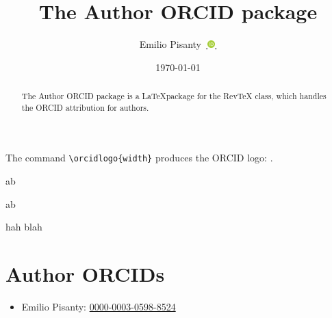 \documentclass[%
  twoside,
  reprint,
  amsmath,amssymb,
  aps,
  pra,
  nofootinbib,
  showpacs,
  superscriptaddress,
  a4paper,
]{revtex4-1}
\newcommand{\orcid}[1]{%
  \href{%
    https://orcid.org/#1%
  }{%
   \,\protect\includegraphics[width=8pt]{ORCID-icon.png}\,%
  }%
}
\begin{document}
\title{The Author ORCID package}


\author{Emilio Pisanty\,\orcid{0000-0003-0598-8524}}


\date{\today}



\begin{abstract}
The Author ORCID package is a \LaTeX package for the RevTeX class, which handles the ORCID attribution for authors.
\end{abstract}

\maketitle

{\color{gray}
\lipsum[1]
}

The command \verb|\orcidlogo{width}| produces the ORCID logo: \orcidlogo{8pt}.

\setlength{\fboxsep}{0pt}

a\fbox{\orcidlogo{8pt}}b

a\orcidlogo{8pt}b

hah blah

























\section*{Author ORCIDs}
\vspace{-1mm}
\begin{itemize}[
  itemsep=-1mm,
  leftmargin=+\relax,
  label={}
  ]
\item Emilio Pisanty:
   \href{https://orcid.org/0000-0003-0598-8524}{0000-0003-0598-8524}
\end{itemize}



 

\end{document}
